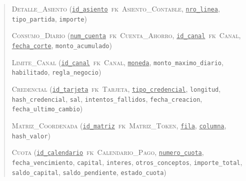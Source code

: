 \begin{quote}\raggedright
\textsc{Detalle\_Asiento} (\underline{\texttt{id\_asiento}}~\textsc{fk}~\textsc{Asiento\_Contable}, \underline{\texttt{nro\_linea}}, \texttt{tipo\_partida}, \texttt{importe})

\textsc{Consumo\_Diario} (\underline{\texttt{num\_cuenta}}~\textsc{fk}~\textsc{Cuenta\_Ahorro}, \underline{\texttt{id\_canal}}~\textsc{fk}~\textsc{Canal}, \underline{\texttt{fecha\_corte}}, \texttt{monto\_acumulado})

\textsc{Limite\_Canal} (\underline{\texttt{id\_canal}}~\textsc{fk}~\textsc{Canal}, \underline{\texttt{moneda}}, \texttt{monto\_maximo\_diario}, \texttt{habilitado}, \texttt{regla\_negocio})

\textsc{Credencial} (\underline{\texttt{id\_tarjeta}}~\textsc{fk}~\textsc{Tarjeta}, \underline{\texttt{tipo\_credencial}}, \texttt{longitud}, \texttt{hash\_credencial}, \texttt{sal}, \texttt{intentos\_fallidos}, \texttt{fecha\_creacion}, \texttt{fecha\_ultimo\_cambio})

\textsc{Matriz\_Coordenada} (\underline{\texttt{id\_matriz}}~\textsc{fk}~\textsc{Matriz\_Token}, \underline{\texttt{fila}}, \underline{\texttt{columna}}, \texttt{hash\_valor})

\textsc{Cuota} (\underline{\texttt{id\_calendario}}~\textsc{fk}~\textsc{Calendario\_Pago}, \underline{\texttt{numero\_cuota}}, \texttt{fecha\_vencimiento}, \texttt{capital}, \texttt{interes}, \texttt{otros\_conceptos}, \texttt{importe\_total}, \texttt{saldo\_capital}, \texttt{saldo\_pendiente}, \texttt{estado\_cuota})
\end{quote}
